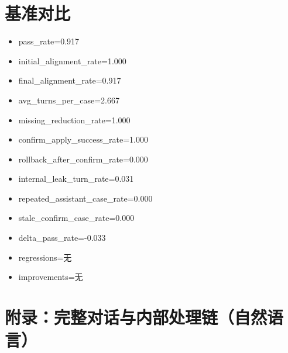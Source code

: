 \documentclass[11pt]{ctexart}
\begin{document}
\section{基准对比}
\begin{itemize}
\item pass\_rate=0.917
\item initial\_alignment\_rate=1.000
\item final\_alignment\_rate=0.917
\item avg\_turns\_per\_case=2.667
\item missing\_reduction\_rate=1.000
\item confirm\_apply\_success\_rate=1.000
\item rollback\_after\_confirm\_rate=0.000
\item internal\_leak\_turn\_rate=0.031
\item repeated\_assistant\_case\_rate=0.000
\item stale\_confirm\_case\_rate=0.000
\item delta\_pass\_rate=-0.033
\item regressions=无
\item improvements=无
\end{itemize}
\appendix
\section{附录：完整对话与内部处理链（自然语言）}
\end{document}
